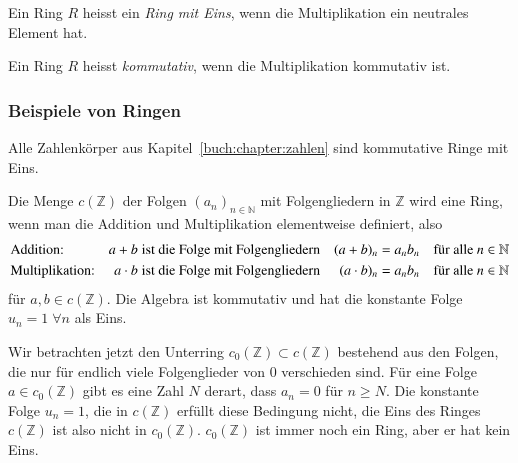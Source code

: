 \begin{definition}
%
Ein Ring $R$ heisst ein {\em Ring mit Eins}, wenn die Multiplikation ein
neutrales Element hat.
%
\end{definition}

\begin{definition}
%
%
Ein Ring $R$ heisst {\em kommutativ}, wenn die Multiplikation kommutativ
ist.
\end{definition}

\subsubsection{Beispiele von Ringen}

\begin{beispiel}
Alle Zahlenkörper aus Kapitel~\ref{buch:chapter:zahlen} sind kommutative
Ringe mit Eins.
\end{beispiel}

\begin{beispiel}
Die Menge $c(\mathbb{Z})$ der Folgen $(a_n)_{n\in\mathbb{N}}$ mit
Folgengliedern in $\mathbb{Z}$ wird eine Ring, wenn man die Addition
und Multiplikation elementweise definiert, also
\begin{align*}
&\text{Addition:}
&
a+b&\text{\;ist die Folge mit Folgengliedern}&
(a+b)_n &= a_nb_n \quad\text{für alle $n\in\mathbb{N}$}
\\
&\text{Multiplikation:}
&
a\cdot b&\text{\;ist die Folge mit Folgengliedern}&
(a\cdot b)_n &=  a_nb_n \quad\text{für alle $n\in\mathbb{N}$}
\end{align*}
für $a,b\in c(\mathbb{Z})$.
Die Algebra ist kommutativ und hat die konstante Folge 
$u_n = 1\;\forall n$ als Eins.

Wir betrachten jetzt den Unterring $c_0(\mathbb{Z})\subset c(\mathbb{Z})$
bestehend aus den Folgen, die nur für endlich viele Folgenglieder von
$0$ verschieden sind.
Für eine Folge $a\in c_0(\mathbb{Z})$ gibt es eine Zahl $N$ derart, dass
$a_n=0$ für $n\ge N$.
Die konstante Folge $u_n=1$, die in $c(\mathbb{Z})$ erfüllt diese
Bedingung nicht, die Eins des Ringes $c(\mathbb{Z})$ ist also nicht in
$c_0(\mathbb{Z})$.
$c_0(\mathbb{Z})$ ist immer noch ein Ring, aber er hat kein Eins.
\end{beispiel}

